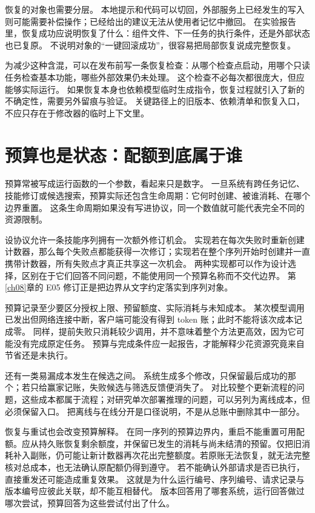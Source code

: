 恢复的对象也需要分层。
本地提示和代码可以切回，外部服务上已经发生的写入则可能需要补偿操作；已经给出的建议无法从使用者记忆中撤回。
在实验报告里，恢复成功应说明恢复了什么：组件文件、下一任务的执行条件，还是外部状态也已复原。
不说明对象的``一键回滚成功''，很容易把局部恢复说成完整恢复。

为减少这种含混，可以在发布前写一条恢复检查：从哪个检查点启动，用哪个只读任务检查基本功能，哪些外部效果仍未处理。
这个检查不必每次都很庞大，但应能够实际运行。
如果恢复本身也依赖模型临时生成指令，恢复过程就引入了新的不确定性，需要另外留痕与验证。
关键路径上的旧版本、依赖清单和恢复入口，不应只存在于修改器的临时上下文里。

\section{预算也是状态：配额到底属于谁}
\label{sec:ch02-budget-state}

预算常被写成运行函数的一个参数，看起来只是数字。
一旦系统有跨任务记忆、技能修订或候选搜索，预算实际还包含生命周期：它何时创建、被谁消耗、在哪个边界重置。
这条生命周期如果没有写进协议，同一个数值就可能代表完全不同的资源限制。

设协议允许一条技能序列拥有一次额外修订机会。
实现若在每次失败时重新创建计数器，那么每个失败点都能获得一次修订；实现若在整个序列开始时创建并一直携带计数器，所有失败点才真正共享这一次机会。
两种实现都可以作为设计选择，区别在于它们回答不同问题，不能使用同一个预算名称而不交代边界。
第\ref{ch08}章的 E05 修订正是把边界从文字约定落实到序列对象。

预算记录至少要区分授权上限、预留额度、实际消耗与未知成本。
某次模型调用已发出但网络连接中断，客户端可能没有得到 token 账；此时不能将该次成本记成零。
同样，提前失败只消耗较少调用，并不意味着整个方法更高效，因为它可能没有完成原定任务。
预算与完成条件应一起报告，才能解释少花资源究竟来自节省还是未执行。

还有一类易漏成本发生在候选之间。
系统生成多个修改，只保留最后成功的那个；若只给赢家记账，失败候选与筛选反馈便消失了。
对比较整个更新流程的问题，这些成本都属于流程；对研究单次部署推理的问题，可以另列为离线成本，但必须保留入口。
把离线与在线分开是口径说明，不是从总账中删除其中一部分。

恢复与重试也会改变预算解释。
在同一序列的预算边界内，重启不能重置可用配额。应从持久账恢复剩余额度，并保留已发生的消耗与尚未结清的预留。仅把旧消耗补入副账，仍可能让新计数器再次花出完整额度。若原账无法恢复，就无法完整核对总成本，也无法确认原配额仍得到遵守。
若不能确认外部请求是否已执行，直接重发还可能造成重复效果。
这就是为什么运行编号、序列编号、请求记录与版本编号应彼此关联，却不能互相替代。
版本回答用了哪套系统，运行回答做过哪次尝试，预算回答为这些尝试付出了什么。

